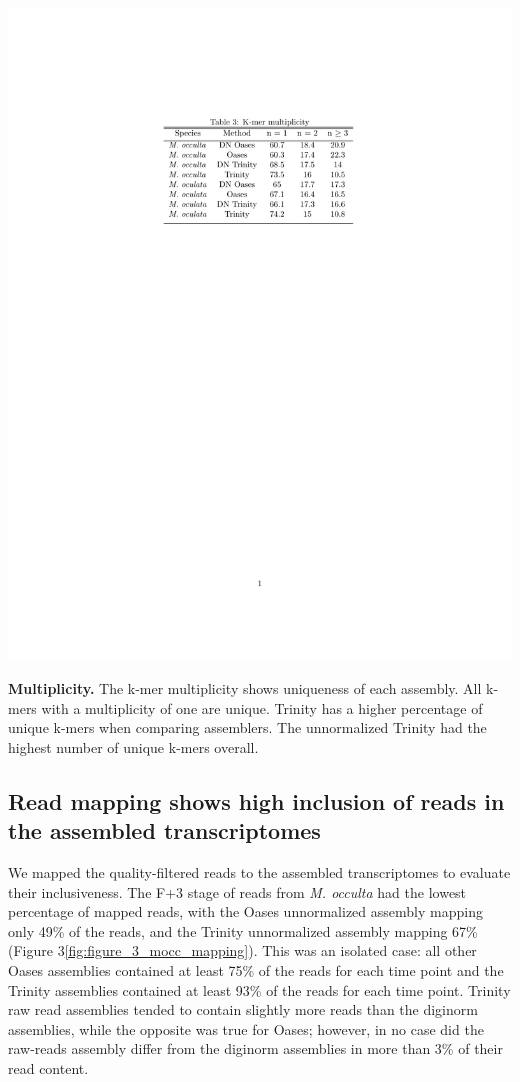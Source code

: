 \begin{table}[tbp]
\centering
\includegraphics[scale=1]{manuscript/Table_3_multiplicity.pdf}
\caption{\textbf{Multiplicity.} The k-mer multiplicity shows uniqueness of each assembly. All k-mers with a multiplicity of one are unique. Trinity has a higher percentage of unique k-mers when comparing assemblers. The unnormalized Trinity had the highest number of unique k-mers overall.}
\label{fig:multiplicity}
\end{table}

\subsection{Read mapping shows high inclusion of reads in the assembled transcriptomes}
	We mapped the quality-filtered reads to the assembled transcriptomes to evaluate their inclusiveness. The F+3 stage of reads from \textit{M. occulta} had the lowest percentage of mapped reads, with the Oases unnormalized assembly mapping only 49\% of the reads, and the Trinity unnormalized assembly mapping 67\% (Figure 3\ref{fig:figure_3_mocc_mapping}). This was an isolated case: all other Oases assemblies contained at least 75\% of the reads for each time point and the Trinity assemblies contained at least 93\% of the reads for each time point. Trinity raw read assemblies tended to contain slightly more reads than the diginorm assemblies, while the opposite was true for Oases; however, in no case did the raw-reads assembly differ from the diginorm assemblies in more than 3\% of their read content.
\setcounter{subfigure}{0}
	
